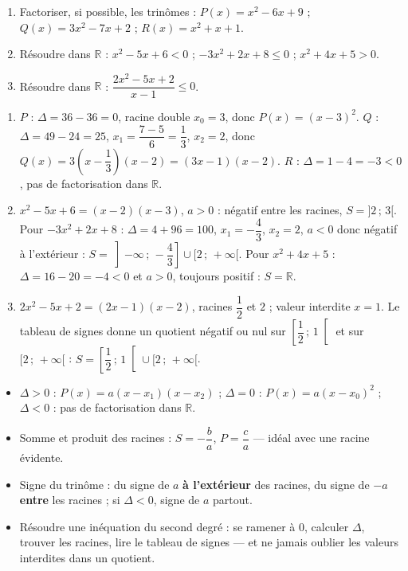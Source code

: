 \documentclass[11pt]{article}
\begin{document}
\begin{exercice}
\begin{enumerate}
\item Factoriser, si possible, les trinômes : $P(x)=x^2-6x+9$ ; $Q(x)=3x^2-7x+2$ ; $R(x)=x^2+x+1$.
\item Résoudre dans $\mathbb{R}$ : $x^2-5x+6<0$ ; $-3x^2+2x+8\leq 0$ ; $x^2+4x+5>0$.
\item Résoudre dans $\mathbb{R}$ : $\dfrac{2x^2-5x+2}{x-1}\leq 0$.
\end{enumerate}
\end{exercice}

\begin{corrige}
\begin{enumerate}
\item $P$ : $\Delta=36-36=0$, racine double $x_0=3$, donc $P(x)=(x-3)^2$. $Q$ : $\Delta=49-24=25$, $x_1=\dfrac{7-5}{6}=\dfrac{1}{3}$, $x_2=2$, donc $Q(x)=3\left(x-\dfrac{1}{3}\right)(x-2)=(3x-1)(x-2)$. $R$ : $\Delta=1-4=-3<0$, pas de factorisation dans $\mathbb{R}$.
\item $x^2-5x+6=(x-2)(x-3)$, $a>0$ : négatif entre les racines, $S=]2\,;\,3[$. Pour $-3x^2+2x+8$ : $\Delta=4+96=100$, $x_1=-\dfrac{4}{3}$, $x_2=2$, $a<0$ donc négatif à l'extérieur : $S=\left]-\infty\,;\,-\dfrac{4}{3}\right]\cup[2\,;\,+\infty[$. Pour $x^2+4x+5$ : $\Delta=16-20=-4<0$ et $a>0$, toujours positif : $S=\mathbb{R}$.
\item $2x^2-5x+2=(2x-1)(x-2)$, racines $\dfrac{1}{2}$ et $2$ ; valeur interdite $x=1$. Le tableau de signes donne un quotient négatif ou nul sur $\left[\dfrac{1}{2}\,;\,1\right[$ et sur $[2\,;\,+\infty[$ : $S=\left[\dfrac{1}{2}\,;\,1\right[\cup[2\,;\,+\infty[$.
\end{enumerate}
\end{corrige}

\begin{aretenir}
\begin{itemize}
\item $\Delta>0$ : $P(x)=a(x-x_1)(x-x_2)$ ; $\Delta=0$ : $P(x)=a(x-x_0)^2$ ; $\Delta<0$ : pas de factorisation dans $\mathbb{R}$.
\item Somme et produit des racines : $S=-\dfrac{b}{a}$, $P=\dfrac{c}{a}$ — idéal avec une racine évidente.
\item Signe du trinôme : du signe de $a$ \textbf{à l'extérieur} des racines, du signe de $-a$ \textbf{entre} les racines ; si $\Delta<0$, signe de $a$ partout.
\item Résoudre une inéquation du second degré : se ramener à $0$, calculer $\Delta$, trouver les racines, lire le tableau de signes — et ne jamais oublier les valeurs interdites dans un quotient.
\end{itemize}
\end{aretenir}
\end{document}
